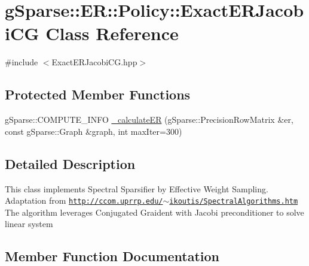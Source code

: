 \hypertarget{classg_sparse_1_1_e_r_1_1_policy_1_1_exact_e_r_jacobi_c_g}{}\section{g\+Sparse\+:\+:ER\+:\+:Policy\+:\+:Exact\+E\+R\+Jacobi\+CG Class Reference}
\label{classg_sparse_1_1_e_r_1_1_policy_1_1_exact_e_r_jacobi_c_g}


{\ttfamily \#include $<$Exact\+E\+R\+Jacobi\+C\+G.\+hpp$>$}

\subsection*{Protected Member Functions}
\begin{DoxyCompactItemize}
\item 
g\+Sparse\+::\+C\+O\+M\+P\+U\+T\+E\+\_\+\+I\+N\+FO \mbox{\hyperlink{classg_sparse_1_1_e_r_1_1_policy_1_1_exact_e_r_jacobi_c_g_a2a57ba70f88213015cdccf1697b375b0}{\+\_\+calculate\+ER}} (g\+Sparse\+::\+Precision\+Row\+Matrix \&er, const g\+Sparse\+::\+Graph \&graph, int max\+Iter=300)
\end{DoxyCompactItemize}


\subsection{Detailed Description}
This class implements Spectral Sparsifier by Effective Weight Sampling. Adaptation from \href{http://ccom.uprrp.edu/~ikoutis/SpectralAlgorithms.htm}{\tt http\+://ccom.\+uprrp.\+edu/$\sim$ikoutis/\+Spectral\+Algorithms.\+htm} The algorithm leverages Conjugated Graident with Jacobi preconditioner to solve linear system 

\subsection{Member Function Documentation}
\mbox{\label{classg_sparse_1_1_e_r_1_1_policy_1_1_exact_e_r_jacobi_c_g_a2a57ba70f88213015cdccf1697b375b0}} 
